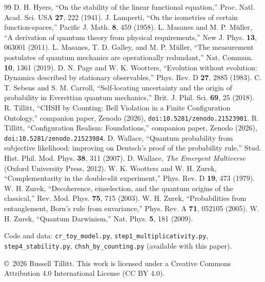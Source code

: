 \documentclass[11pt]{article}
\theoremstyle{definition}
\theoremstyle{remark}
\begin{document}
\begin{thebibliography}{99}
 D. H. Hyers, ``On the stability of the linear functional equation,'' Proc. Natl. Acad. Sci. USA \textbf{27}, 222 (1941).
 J. Lamperti, ``On the isometries of certain function-spaces,'' Pacific J. Math. \textbf{8}, 459 (1958).
 L. Masanes and M. P. M\"uller, ``A derivation of quantum theory from physical requirements,'' New J. Phys. \textbf{13}, 063001 (2011).
 L. Masanes, T. D. Galley, and M. P. M\"uller, ``The measurement postulates of quantum mechanics are operationally redundant,'' Nat. Commun. \textbf{10}, 1361 (2019).
 D. N. Page and W. K. Wootters, ``Evolution without evolution: Dynamics described by stationary observables,'' Phys. Rev. D \textbf{27}, 2885 (1983).
 C. T. Sebens and S. M. Carroll, ``Self-locating uncertainty and the origin of probability in Everettian quantum mechanics,'' Brit. J. Phil. Sci. \textbf{69}, 25 (2018).
 R. Tillitt, ``CHSH by Counting: Bell Violation in a Finite Configuration Ontology,'' companion paper, Zenodo (2026), \texttt{doi:10.5281/zenodo.21523901}.
 R. Tillitt, ``Configuration Realism: Foundations,'' companion paper, Zenodo (2026), \texttt{doi:10.5281/zenodo.21523984}.
 D. Wallace, ``Quantum probability from subjective likelihood: improving on Deutsch's proof of the probability rule,'' Stud. Hist. Phil. Mod. Phys. \textbf{38}, 311 (2007).
 D. Wallace, \emph{The Emergent Multiverse} (Oxford University Press, 2012).
 W. K. Wootters and W. H. Zurek, ``Complementarity in the double-slit experiment,'' Phys. Rev. D \textbf{19}, 473 (1979).
 W. H. Zurek, ``Decoherence, einselection, and the quantum origins of the classical,'' Rev. Mod. Phys. \textbf{75}, 715 (2003).
 W. H. Zurek, ``Probabilities from entanglement, Born's rule from envariance,'' Phys. Rev. A \textbf{71}, 052105 (2005).
 W. H. Zurek, ``Quantum Darwinism,'' Nat. Phys. \textbf{5}, 181 (2009).
\end{thebibliography}

\vspace{1em}
\noindent\small Code and data: \texttt{cr\_toy\_model.py}, \texttt{step1\_multiplicativity.py}, \texttt{step4\_stability.py}, \texttt{chsh\_by\_counting.py} (available with this paper).

\smallskip
\noindent\small \copyright\ 2026 Russell Tillitt. This work is licensed under a Creative Commons Attribution 4.0 International License (CC BY 4.0).
\end{document}
